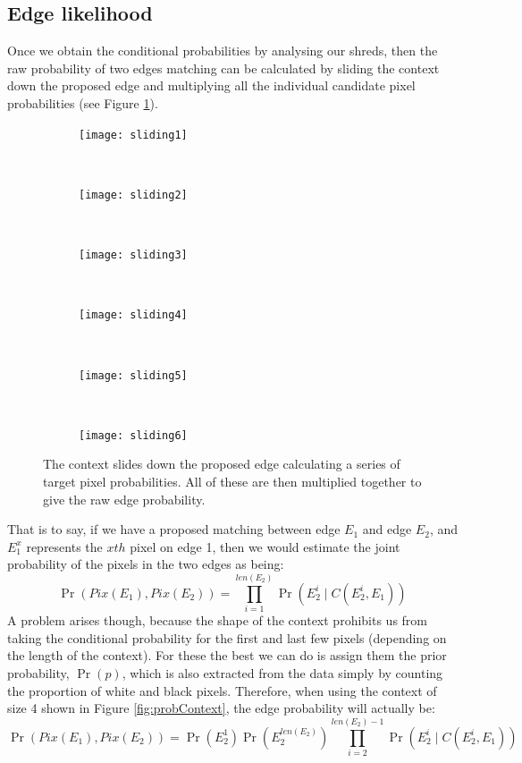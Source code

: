 \clearpage
\subsection{Edge likelihood}

Once we obtain the conditional probabilities by analysing our shreds, then the raw probability of two edges matching can be calculated by sliding the context down the proposed edge and multiplying all the individual candidate pixel probabilities (see Figure \ref{fig:sliding}). 
\begin{figure}[h]
        \centering
        \begin{subfigure}[b]{0.49\textwidth}
                \centering
                \texttt{[image: sliding1]}
        \end{subfigure}
        ~ 
        \begin{subfigure}[b]{0.49\textwidth}
                \centering
                \texttt{[image: sliding2]}
        \end{subfigure}
        ~ 
        \begin{subfigure}[b]{0.49\textwidth}
                \centering
                \texttt{[image: sliding3]}
        \end{subfigure}
        ~ 
        \begin{subfigure}[b]{0.49\textwidth}
                \centering
                \texttt{[image: sliding4]}
        \end{subfigure}
        ~
        \begin{subfigure}[b]{0.49\textwidth}
                \centering
                \texttt{[image: sliding5]}
        \end{subfigure}
        ~ 
        \begin{subfigure}[b]{0.49\textwidth}
                \centering
                \texttt{[image: sliding6]}
        \end{subfigure}
        \caption{The context slides down the proposed edge calculating a series of target pixel probabilities. All of these are then multiplied together to give the raw edge probability.}
        \label{fig:sliding}
\end{figure}

That is to say, if we have a proposed matching between edge \(E_1\) and edge \(E_2\), and \(E_1^x\) represents the $xth$ pixel on edge 1, then we would estimate the joint probability of the pixels in the two edges as being: \[\Pr(Pix(E_1),Pix(E_2)) = \prod_{i=1}^{len(E_2)} \Pr(E_2^i \mid C(E_2^i,E_1))\] A problem arises though, because the shape of the context prohibits us from taking the conditional probability for the first and last few pixels (depending on the length of the context). For these the best we can do is assign them the prior probability, \(\Pr(p)\), which is also extracted from the data simply by counting the proportion of white and black pixels. Therefore, when using the context of size 4 shown in Figure \ref{fig:probContext}, the edge probability will actually be: \[\Pr(Pix(E_1),Pix(E_2)) = \Pr(E_2^1) \Pr(E_2^{len(E_2)}) \prod_{i=2}^{len(E_2)-1} \Pr(E_2^i \mid C(E_2^i,E_1)) \]

